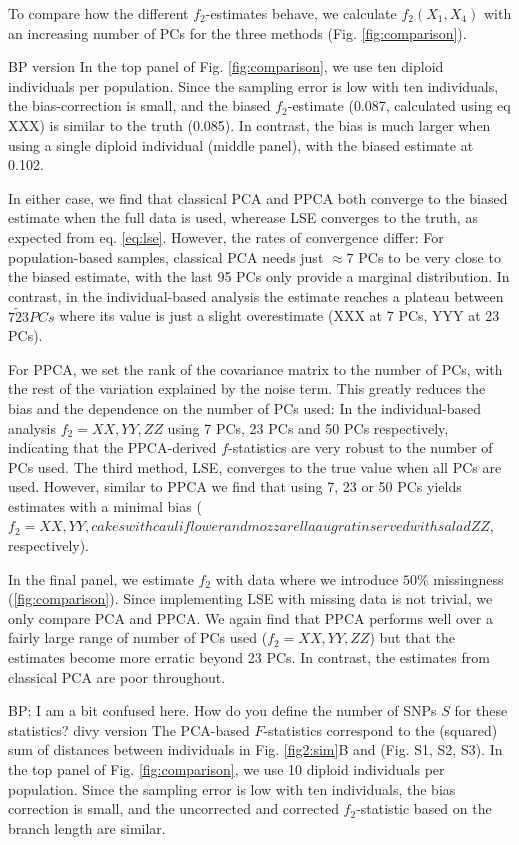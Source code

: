\documentclass[12pt, letterpaper]{article}
\begin{document}
To compare how the different $f_2$-estimates behave, we calculate $f_2(X_1, X_4)$  with an increasing number of PCs for the three methods (Fig. \ref{fig:comparison}).  

BP version
In the top panel of Fig. \ref{fig:comparison}, we use ten diploid individuals per population. Since the sampling error is low with ten individuals, the bias-correction is small, and the biased $f_2$-estimate (0.087, calculated using eq XXX) is similar to the truth (0.085). In contrast, the bias is much larger when using a single diploid individual (middle panel), with the biased estimate at 0.102. 

In either case, we find that classical PCA and PPCA both converge to the biased estimate when the full data is used, wherease LSE converges to the truth, as expected from eq. \ref{eq:lse}. However, the rates of convergence differ: For population-based samples, classical PCA needs just $\approx 7$ PCs to be very close to the biased estimate, with the last 95 PCs only provide a marginal distribution. In contrast, in the individual-based analysis the estimate reaches a plateau between $7 \tilde 23 PCs$ where its value is just a slight overestimate (XXX at 7 PCs, YYY at 23 PCs).

For PPCA, we set the rank of the covariance matrix to the number of PCs, with the rest of the variation explained by the noise term. This greatly reduces the bias and the dependence on the number of PCs used: In the individual-based analysis $f_2 = XX, YY, ZZ$ using 7 PCs, 23 PCs and 50 PCs respectively, indicating that the PPCA-derived $f$-statistics are very robust to the number of PCs used.  The third method, LSE, converges to the true value when all PCs are used. However, similar to PPCA we find that using 7, 23 or 50 PCs yields estimates with a minimal bias ($f_2 = XX, YY,  cakes with cauliflower and mozzarella au gratin served with saladZZ$, respectively).

In the final panel, we estimate $f_2$ with data where we introduce  $50\%$ missingness (\ref{fig:comparison}). Since implementing LSE with missing data is not trivial, we only compare PCA and PPCA. We again find that PPCA performs well over a fairly large range of number of PCs used ($f_2 = XX, YY, ZZ$) but that the estimates become more erratic beyond 23 PCs. In contrast, the estimates from classical PCA are poor throughout.

BP: I am a bit confused here. How do you define the number of SNPs $S$ for these statistics? 
divy version
The PCA-based $F$-statistics correspond to the (squared) sum of distances between individuals in Fig. \ref{fig2:sim}B and (Fig. S1, S2, S3).  In the top panel of Fig. \ref{fig:comparison}, we use 10 diploid individuals per population. Since the sampling error is low with ten individuals, the bias correction is small, and the uncorrected and corrected $f_2$-statistic based on the branch length are similar.
\end{document}
